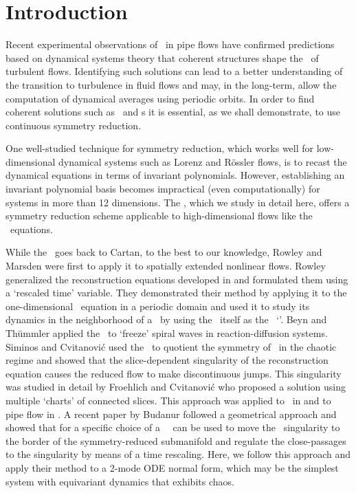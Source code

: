 \section{Introduction}
\label{s:intro}

Recent experimental observations of \reqva\ in pipe flows have confirmed
predictions based on dynamical systems theory that coherent structures shape 
the \statesp\ of turbulent flows. Identifying such solutions can lead to a better
understanding of the transition to turbulence in fluid flows and may, in the long-term,
allow the computation of dynamical averages using periodic orbits. In order to
find coherent solutions such as \reqva\ and \rpo s it is essential, as we shall demonstrate, 
to use continuous symmetry reduction.

One well-studied technique for symmetry reduction, which works well for low-dimensional dynamical systems such 
as Lorenz and R\"{o}ssler flows, is to recast the dynamical equations in terms of invariant polynomials. However, establishing an invariant polynomial basis becomes impractical (even computationally) for systems in more than 12 dimensions.
The \mslices%
,
which we study in detail here, offers a symmetry reduction
scheme applicable to high-dimensional flows like the \NS\ equations.

While the \mslices\ goes back to Cartan, to the
best to our knowledge, Rowley and Marsden
were first to apply it to spatially extended nonlinear flows. Rowley
\etal~ generalized the reconstruction equations
developed in  and formulated them using a `rescaled
time' variable. They demonstrated their method by applying it to the one-dimensional \KS\ equation
in a periodic domain and used it to study its dynamics in the neighborhood of a \reqv\ by using the \reqv\ itself as the \slice\ `\template'.  Beyn and
Th\"{u}mmler applied the \mslices\ to `freeze' spiral
waves in reaction-diffusion systems.
Siminos and Cvitanovi\'{c} used the \mslices\ to quotient the  symmetry of
\cLf\ in the chaotic regime and showed that the slice-dependent
singularity of the reconstruction equation causes the reduced flow to make
discontinuous jumps. This singularity was studied in detail by 
Froehlich and Cvitanovi\'{c} who proposed a solution using multiple `charts' of connected
slices. This approach was applied to \cLf\
in  and to pipe flow in . A
recent paper by Budanur \etal{} followed a geometrical approach
and showed that for \SOn{2} a specific choice of a \slice\
\template\ can be used to move the \slice\ singularity to the border of the
symmetry-reduced submanifold and regulate the close-passages to the
singularity by means of a time rescaling. Here, we follow this approach
and apply their method to a 2-mode ODE normal form, which may be
the simplest system with \SOn{2} equivariant dynamics
that exhibits chaos.

